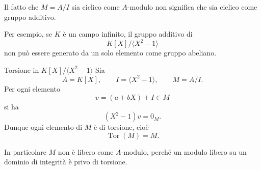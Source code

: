 \documentclass[a4paper]{article}
\begin{document}
\begin{radioactive}
\begin{snippetremark}{}
    Il fatto che \(M=A/I\) sia ciclico come \(A\)-modulo non significa che sia ciclico come gruppo additivo.

    Per esempio, se \(K\) è un campo infinito, il gruppo additivo di
    \[
        K[X]/\langle X^2-1 \rangle
    \]
    non può essere generato da un solo elemento come gruppo abeliano.
\end{snippetremark}
\end{radioactive}

\begin{radioactive}
\begin{snippetexample}{Torsione in \(K[X]/\langle X^2-1 \rangle\)}
    Sia
    \[
        A=K[X],
        \qquad
        I=\langle X^2-1 \rangle,
        \qquad
        M=A/I.
    \]
    Per ogni elemento
    \[
        v=(a+bX)+I\in M
    \]
    si ha
    \[
        (X^2-1)v=0_M.
    \]
    Dunque ogni elemento di \(M\) è di torsione, cioè
    \[
        \operatorname{Tor}(M)=M.
    \]

    In particolare \(M\) non è libero come \(A\)-modulo, perché un modulo libero su un dominio di integrità è privo di torsione.
\end{snippetexample}
\end{radioactive}
\end{document}

